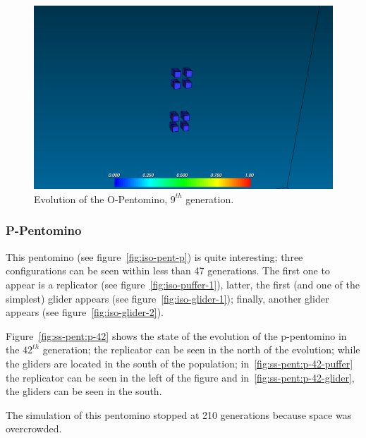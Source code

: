 \begin{figure}
	\centering
	\includegraphics[scale=0.3]{pentominoes_ss/o_osc.png}
	\caption{Evolution of the O-Pentomino, $9^{th}$ generation.}
  \label{fig:ss-pent:o-osc}
\end{figure}

\subsubsection{P-Pentomino}
\label{sec:p-pentomino}

This pentomino (see figure~\ref{fig:iso-pent-p}) is quite interesting; three
configurations can be seen within less than 47 generations. The first one to
appear is a replicator (see figure~\ref{fig:iso-puffer-1}), latter, the first
(and one of the simplest) glider appears (see figure~\ref{fig:iso-glider-1});
finally, another glider appears (see figure~\ref{fig:iso-glider-2}).

Figure~\ref{fig:ss-pent:p-42} shows the state of the evolution of the
p-pentomino in the $42^{th}$ generation; the replicator can be seen in the north
of the evolution; while the gliders are located in the south of the population;
in~\ref{fig:ss-pent:p-42-puffer} the replicator can be seen in the left of the
figure and in~\ref{fig:ss-pent:p-42-glider}, the gliders can be seen in the
south.

The simulation of this pentomino stopped at 210 generations because space
was overcrowded.

